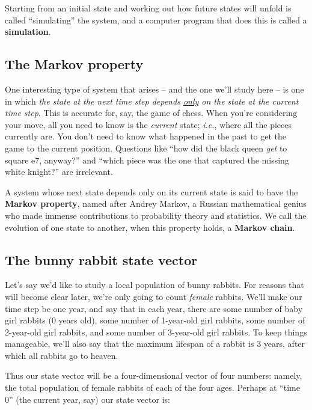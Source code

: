 
Starting from an initial state and working out how future states will unfold is
called ``simulating'' the system, and a computer program that does this is
called a \textbf{simulation}.

\subsection{The Markov property}

One interesting type of system that arises -- and the one we'll study here --
is one in which \textit{the state at the next time step depends
\underline{only} on the state at the current time step}. This is accurate for,
say, the game of chess. When you're considering your move, all you need to know
is the \textit{current} state; \textit{i.e.}, where all the pieces currently
are. You don't need to know what happened in the past to get the game to the
current position. Questions like ``how did the black queen \textit{get} to
square e7, anyway?'' and ``which piece was the one that captured the missing
white knight?'' are irrelevant.


A system whose next state depends only on its current state is said to have the
\textbf{Markov property}, named after Andrey Markov, a Russian mathematical
genius who made immense contributions to probability theory and statistics. We
call the evolution of one state to another, when this property holds, a
\textbf{Markov chain}.

\subsection{The bunny rabbit state vector}


Let's say we'd like to study a local population of bunny rabbits. For reasons
that will become clear later, we're only going to count \textit{female}
rabbits. We'll make our time step be one year, and say that in each year, there
are some number of baby girl rabbits (0 years old), some number of 1-year-old
girl rabbits, some number of 2-year-old girl rabbits, and some number of
3-year-old girl rabbits. To keep things manageable, we'll also say that the
maximum lifespan of a rabbit is 3 years, after which all rabbits go to heaven.

Thus our state vector will be a four-dimensional vector of four numbers:
namely, the total population of female rabbits of each of the four ages.
Perhaps at ``time 0'' (the current year, say) our state vector is:

